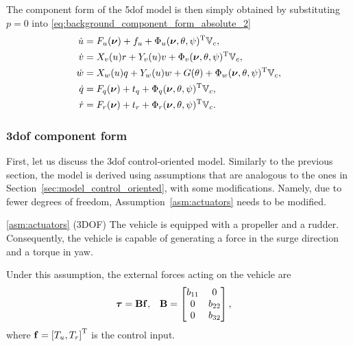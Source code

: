 The component form of the 5\gls{dof} model is then simply obtained by substituting $p = 0$ into \eqref{eq:background_component_form_absolute_2}
\begin{subequations}
    \begin{align}
        \dot{u} &= F_u(\bm{\nu}) + f_u + \Phi_u(\bm{\nu}, \theta, \psi)^{\mathrm{T}}\mathbb{V}_c, \\
        \dot{v} &= X_v(u)r + Y_v(u)v + \Phi_v(\bm{\nu}, \theta, \psi)^{\mathrm{T}}\mathbb{V}_c, \\
        \dot{w} &= X_w(u)q + Y_w(u)w + G(\theta) + \Phi_w(\bm{\nu}, \theta, \psi)^{\mathrm{T}}\mathbb{V}_c, \\
        \dot{q} &= F_q(\bm{\nu}) + t_q + \Phi_q(\bm{\nu}, \theta, \psi)^{\mathrm{T}}\mathbb{V}_c, \\
        \dot{r} &= F_r(\bm{\nu}) + t_r + \Phi_r(\bm{\nu}, \theta, \psi)^{\mathrm{T}}\mathbb{V}_c.
    \end{align}
    \label{eq:background_component_form_5DOF}
\end{subequations}

\subsubsection{3\gls{dof} component form}
First, let us discuss the 3\gls{dof} control-oriented model.
Similarly to the previous section, the model is derived using assumptions that are analogous to the ones in Section~\ref{sec:model_control_oriented}, with some modifications.
Namely, due to fewer degrees of freedom, Assumption~\ref{asm:actuators} needs to be modified.

\begin{customasm}{\ref*{asm:actuators} (3DOF)}
    \label{asm:actuators_3DOF}
    The vehicle is equipped with a propeller and a rudder.
    Consequently, the vehicle is capable of generating a force in the surge direction and a torque in yaw.
\end{customasm}

Under this assumption, the external forces acting on the vehicle are
\begin{align}
    \bm{\tau} &= \mathbf{B}\mathbf{f}, &
    \mathbf{B} &= 
    \begin{bmatrix}
        b_{11} & 0 \\ 0 & b_{22} \\ 0 & b_{32}
    \end{bmatrix},
\end{align}
where $\mathbf{f} = \left[T_u, T_r\right]^{\mathrm{T}}$ is the control input.

